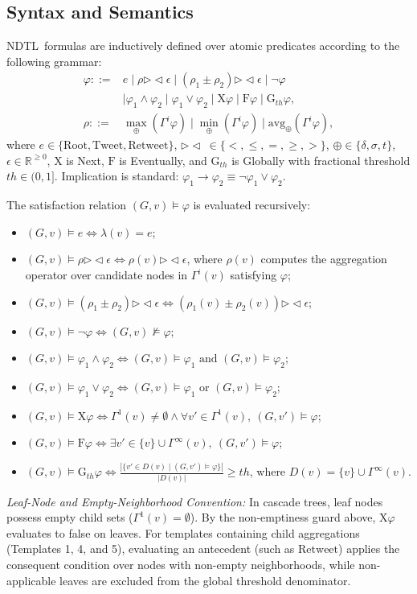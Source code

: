 \documentclass[10pt,twocolumn,a4paper]{article}
\renewcommand{\bowtie}{\mathrel{\triangleright\!\triangleleft}}
\newcommand{\NDTL}{\textsc{NDTL}}
\begin{document}
\subsection{Syntax and Semantics}
\NDTL\ formulas are inductively defined over atomic predicates according to the following grammar:
\begin{align}
\varphi ::={}& e \mid \rho \bowtie \epsilon \mid (\rho_1 \pm \rho_2)\bowtie\epsilon \mid \neg\varphi \nonumber\\
& \mid \varphi_1\wedge\varphi_2 \mid \varphi_1\vee\varphi_2 \mid \mathrm{X}\varphi \mid \mathrm{F}\varphi \mid \mathrm{G}_{th}\varphi,\\
\rho ::={}& \max_{\oplus}(\Gamma^i\varphi) \mid \min_{\oplus}(\Gamma^i\varphi) \mid \mathrm{avg}_{\oplus}(\Gamma^i\varphi),
\end{align}
where $e\in\{\mathrm{Root},\mathrm{Tweet},\mathrm{Retweet}\}$, $\bowtie\ \in\{<,\le,=,\ge,>\}$, $\oplus\in\{\delta,\sigma,t\}$, $\epsilon\in\mathbb{R}^{\ge 0}$, $\mathrm{X}$ is Next, $\mathrm{F}$ is Eventually, and $\mathrm{G}_{th}$ is Globally with fractional threshold $th\in(0,1]$. Implication is standard: $\varphi_1 \to \varphi_2 \equiv \neg\varphi_1 \lor \varphi_2$.
 
The satisfaction relation $(G,v)\models\varphi$ is evaluated recursively:
\begin{itemize}
  \item $(G,v)\models e \iff \lambda(v)=e$;
  \item $(G,v)\models \rho\bowtie\epsilon \iff \rho(v)\bowtie\epsilon$, where $\rho(v)$ computes the aggregation operator over candidate nodes in $\Gamma^i(v)$ satisfying $\varphi$;
  \item $(G,v)\models (\rho_1 \pm \rho_2)\bowtie\epsilon \iff (\rho_1(v) \pm \rho_2(v))\bowtie\epsilon$;
  \item $(G,v)\models \neg\varphi \iff (G,v)\not\models\varphi$;
  \item $(G,v)\models \varphi_1 \land \varphi_2 \iff (G,v)\models \varphi_1 \text{ and } (G,v)\models \varphi_2$;
  \item $(G,v)\models \varphi_1 \lor \varphi_2 \iff (G,v)\models \varphi_1 \text{ or } (G,v)\models \varphi_2$;
  \item $(G,v)\models \mathrm{X}\varphi \iff \Gamma^1(v) \neq \emptyset \land \forall v'\in\Gamma^1(v),\ (G,v')\models\varphi$;
  \item $(G,v)\models \mathrm{F}\varphi \iff \exists v'\in\{v\}\cup\Gamma^{\infty}(v),\ (G,v')\models\varphi$;
  \item $(G,v)\models \mathrm{G}_{th}\varphi \iff \frac{|\{v'\in D(v) \mid (G,v')\models\varphi\}|}{|D(v)|} \ge th$, where $D(v)=\{v\}\cup\Gamma^{\infty}(v)$.
\end{itemize}
\emph{Leaf-Node and Empty-Neighborhood Convention:} In cascade trees, leaf nodes possess empty child sets ($\Gamma^1(v) = \emptyset$). By the non-emptiness guard above, $\mathrm{X}\varphi$ evaluates to false on leaves. For templates containing child aggregations (Templates 1, 4, and 5), evaluating an antecedent (such as $\mathrm{Retweet}$) applies the consequent condition over nodes with non-empty neighborhoods, while non-applicable leaves are excluded from the global threshold denominator.
 
\end{document}
